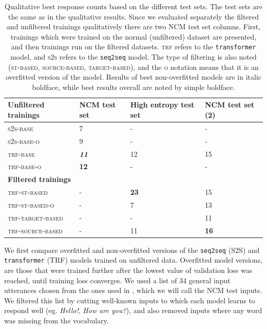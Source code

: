 \documentclass[11pt,a4paper]{article}
\begin{document}
\begin{table}[t!]
	\begin{center}
		\begin{tabular}{llll}
			
			\bf Unfiltered trainings & NCM test set & High entropy test set & NCM test set (2) \\ \hline
			
			\textsc{s2s-base} & 7 & - & - \\
			\textsc{s2s-base-o} & 9 & - & - \\
			\textsc{trf-base} & \textbf{\textit{11}} & 12 & 15 \\
			\textsc{trf-base-o} & \textbf{12} & - & - \\ \hline
			
			\bf Filtered trainings & & & \\ \hline
			\textsc{trf-st-based} & - & \textbf{23} & 15 \\
			\textsc{trf-st-based-o} & - & 7 & 13 \\
			\textsc{trf-target-based} & - & - & 11 \\
			\textsc{trf-source-based} & - & 11 & \textbf{16} \\ \hline
			
		\end{tabular}
	\end{center}
	\caption{\label{table:qualitative_numbers} Qualitative best response counts based on the different test sets. The test sets are the same as in the qualitative results. Since we evaluated separately the filtered and unfiltered trainings qualitatively there are two NCM test set columns. First, trainings which were trained on the normal (unfiltered) dataset are presented, and then trainings run on the filtered datasets. \textsc{trf} refers to the \texttt{transformer} model, and \textsc{s2s} refers to the \texttt{seq2seq} model. The type of filtering is also noted (\textsc{st-based}, \textsc{source-based}, \textsc{target-based}), and the \textsc{o} notation means that it is an overfitted version of the model. Results of best non-overfitted models are in italic boldface, while best results overall are noted by simple boldface.}
\end{table}

We first compare overfitted and non-overfitted versions of the \texttt{seq2seq} (S2S) and
\texttt{transformer} (TRF) models trained on unfiltered data. Overfitted model versions,
are those that were trained further after the lowest value of validation loss
was reached, until training loss converges. We used a list of 34 general input utterances chosen from the ones used in \citet{Vinyals:2015d}, which we will call the NCM test inputs. We filtered this list by cutting well-known inputs to which each model learns to respond well (eg. \textit{Hello!}, \textit{How are you?}), and also removed inputs where any word was missing from the vocabulary.
\end{document}
